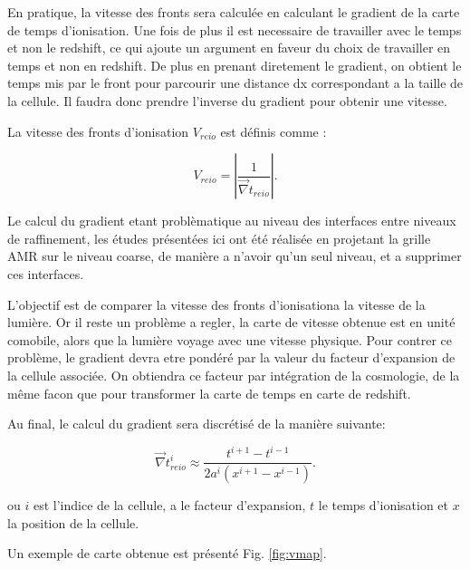 En pratique, la vitesse des fronts sera calculée en calculant le gradient de la carte de temps d'ionisation.
Une fois de plus il est necessaire de travailler avec le temps et non le redshift, ce qui ajoute un argument en faveur du choix de travailler en temps et non en redshift.
De plus en prenant diretement le gradient, on obtient le temps mis par le front pour parcourir une distance dx correspondant a la taille de la cellule.
Il faudra donc prendre l'inverse du gradient pour obtenir une vitesse.

La vitesse des fronts d'ionisation $V_{reio}$ est définis comme :

\begin{equation}
V_{reio}  = \left | \frac{1}{ \vec{\nabla} t_{reio}} \right| .
\end{equation}


Le calcul du gradient etant problèmatique au niveau des interfaces entre niveaux de raffinement, les études présentées ici ont été réalisée en projetant la grille AMR sur le niveau coarse, de manière a n'avoir qu'un seul niveau, et a supprimer ces interfaces.

L'objectif est de comparer la vitesse des fronts d'ionisationa la vitesse de la lumière.
Or il reste un problème a regler, la carte de vitesse obtenue est en unité comobile, alors que la lumière voyage avec une vitesse physique.
Pour contrer ce problème, le gradient devra etre pondéré par la valeur du facteur d'expansion de la cellule associée.
On obtiendra ce facteur par intégration de la cosmologie, de la même facon que pour transformer la carte de temps en carte de redshift.

Au final, le calcul du gradient sera discrétisé de la manière suivante:

\begin{equation}
\vec{\nabla} t_{reio}^i \approx \frac{t^{i+1}  - t^{i-1}}{2a^i \left( x^{i+1}  - x^{i-1} \right)}.
\end{equation}

ou $i$ est l'indice de la cellule, a le facteur d'expansion, $t$ le temps d'ionisation et $x$  la position de la cellule.

Un exemple de carte obtenue est présenté Fig. \ref{fig:vmap}.

